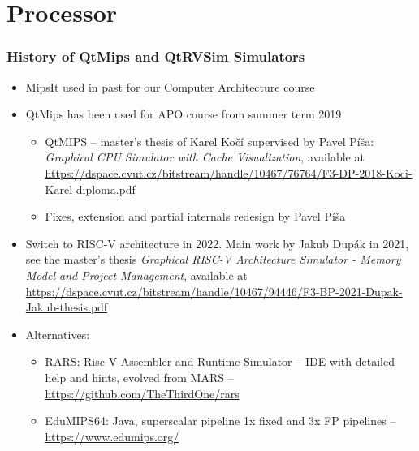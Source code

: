 \documentclass{beamer}
\subtitle{Lecture 03. Central Processing Unit (CPU)}
\author{Pavel Píša \phantom{xxxxxxx} Petr Štěpán \\ \small\texttt{pisa@fel.cvut.cz}\phantom{xxxx}\small\texttt{stepan@fel.cvut.cz}}
\begin{document}
\maketitle

\section{Processor}

\begin{frame}
\frametitle{History of QtMips and QtRVSim Simulators}

\begin{itemize}
\item MipsIt used in past for our Computer Architecture course
\item QtMips has been used for APO course from summer term 2019
\begin{itemize}
\item QtMIPS -- master's thesis of Karel Kočí supervised by Pavel Píša: \textit{Graphical CPU Simulator with Cache Visualization}, available at
{\footnotesize \url{https://dspace.cvut.cz/bitstream/handle/10467/76764/F3-DP-2018-Koci-Karel-diploma.pdf}}
\item Fixes, extension and partial internals redesign by Pavel Píša
\end{itemize}
\item Switch to RISC-V architecture in 2022. Main work by Jakub Dupák in 2021, see the master's thesis \textit{Graphical RISC-V Architecture Simulator - Memory Model and Project Management}, available at
{\footnotesize \url{https://dspace.cvut.cz/bitstream/handle/10467/94446/F3-BP-2021-Dupak-Jakub-thesis.pdf}}
\item Alternatives:
\begin{itemize}
 \item RARS: Risc-V Assembler and Runtime Simulator -- IDE with detailed help and hints, evolved from MARS -- \url{https://github.com/TheThirdOne/rars}
 \item EduMIPS64: Java, superscalar pipeline 1x fixed and 3x FP pipelines -- \url{https://www.edumips.org/}
\end{itemize}
\end{itemize}

\end{frame}
\end{document}
